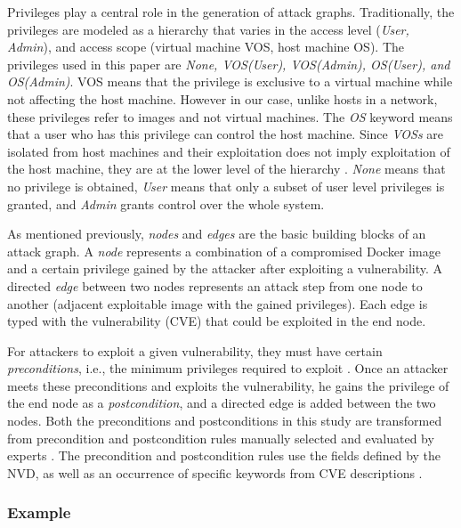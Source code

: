 Privileges play a central role in the generation of attack graphs. Traditionally, the privileges are modeled as a hierarchy that varies in the access level (\textit{User, Admin}), and access scope (virtual machine VOS, host machine OS). The privileges used in this paper are \textit{None, VOS(User), VOS(Admin), OS(User), and OS(Admin)}. VOS means that the privilege is exclusive to a virtual machine while not affecting the host machine. However in our case, unlike hosts in a network, these privileges refer to images and not virtual machines. The \textit{OS} keyword means that a user who has this privilege can control the host machine. Since \textit{VOSs} are isolated from host machines and their exploitation does not imply exploitation of the host machine, they are at the lower level of the hierarchy \cite{aksu2018automated}. \textit{None} means that no privilege is obtained, \textit{User} means that only a subset of user level privileges is granted, and \textit{Admin} grants control over the whole system.

As mentioned previously, \textit{nodes} and \textit{edges} are the basic building blocks of an attack graph. A \textit{node} represents a combination of a compromised Docker image and a certain privilege gained by the attacker after exploiting a vulnerability. A directed \textit{edge} between two nodes represents an attack step from one node to another (adjacent exploitable image with the gained privileges). Each edge is typed with the vulnerability (CVE) that could be exploited in the end node.

For attackers to exploit a given vulnerability, they must have certain \textit{preconditions}, i.e., the minimum privileges required to exploit \cite{aksu2018automated}. Once an attacker meets these preconditions and exploits the vulnerability, he gains the privilege of the end node as a \textit{postcondition}, and a directed edge is added between the two nodes. Both the preconditions and postconditions in this study are transformed from precondition and postcondition rules manually selected and evaluated by experts \cite{aksu2018automated}. The precondition and postcondition rules use the fields defined by the NVD, as well as an occurrence of specific keywords from CVE descriptions \cite{booth2013national}.

\subsubsection{Example}

